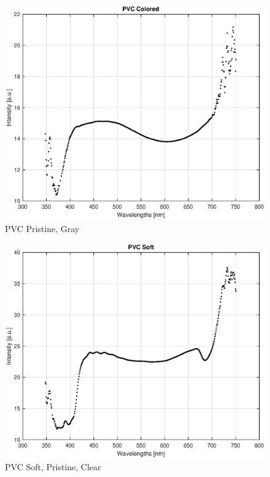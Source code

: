 \begin{appendices}
\begin{figure}
    \centering
    \includegraphics[width = 12cm]{Images/appendix/pvc-pristine-colored.eps}
    \caption[$\; \:$PVC Pristine]{PVC Pristine, Gray}
    \label{fig:pvc-gray}
\end{figure}

\begin{figure}
    \centering
    \includegraphics[width = 12cm]{Images/appendix/pvc-soft-pristine-clear.eps}
    \caption[$\; \:$PVC Soft]{PVC Soft, Pristine, Clear}
\end{figure}


\end{appendices}
